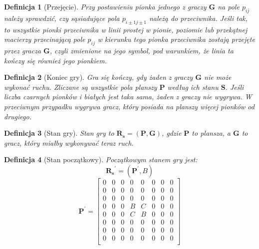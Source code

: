 \documentclass[12pt, a4paper]{article}
\newtheorem{definition}{Definicja}
\begin{document}
\begin{definition}[Przejęcie]
    Przy postawieniu pionka jednego z graczy $\boldsymbol{G}$ na pole $p_{ij}$ należy sprawdzić, czy sąsiadujące pola
    $p_{i \pm 1 j \pm 1}$ należą do przeciwnika. Jeśli tak, to wszystkie pionki przeciwnika w linii prostej w
    pionie, poziomie lub przekątnej macierzy przecinającą pole $p_{ij}$ w kierunku tego pionka przeciwnika zostają przejęte
    przez gracza $\boldsymbol{G}$, czyli zmienione na jego symbol, pod warunkiem, że linia ta kończy się również jego pionkiem.
\end{definition}

\begin{definition}[Koniec gry]
    Gra się kończy, gdy żaden z graczy $\boldsymbol{G}$ nie może wykonać ruchu.
    Zliczane są wszystkie pola planszy $\boldsymbol{P}$ według ich stanu $\boldsymbol{S}$.
    Jeśli liczba czarnych pionków i białych jest taka sama, żaden z graczy nie wygrywa.
    W przeciwnym przypadku wygrywa gracz, który posiada na planszy więcej pionków od drugiego.
\end{definition}

\begin{definition}[Stan gry]
    Stan gry to $\boldsymbol{R_{s}} = (\boldsymbol{P}, \boldsymbol{G})$, gdzie $\boldsymbol{P}$ to plansza, a $\boldsymbol{G}$ to gracz,
    który miałby wykonywać teraz ruch. 
\end{definition}

\begin{definition}[Stan początkowy]
    Początkowym stanem gry jest:
    $$\boldsymbol{R_{s}}^\prime = (\boldsymbol{P}^\prime, B)$$
    $$
        \boldsymbol{P}^\prime = 
        \begin{bmatrix}
            0 & 0 & 0 & 0 & 0 & 0 & 0 & 0 \\
            0 & 0 & 0 & 0 & 0 & 0 & 0 & 0 \\
            0 & 0 & 0 & 0 & 0 & 0 & 0 & 0 \\
            0 & 0 & 0 & B & C & 0 & 0 & 0 \\
            0 & 0 & 0 & C & B & 0 & 0 & 0 \\
            0 & 0 & 0 & 0 & 0 & 0 & 0 & 0 \\
            0 & 0 & 0 & 0 & 0 & 0 & 0 & 0 \\
            0 & 0 & 0 & 0 & 0 & 0 & 0 & 0 \\
        \end{bmatrix}
    $$
\end{definition}
\end{document}
